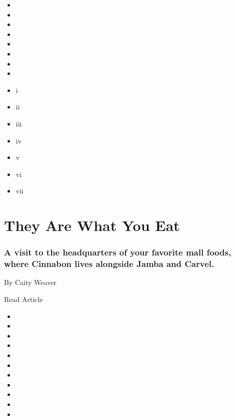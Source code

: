 \begin{itemize}
\item
\item
\item
\item
\item
\item
\item
\item
\end{itemize}

\begin{itemize}
\item
  i
\item
  ii
\item
  iii
\item
  iv
\item
  v
\item
  vi
\item
  vii
\end{itemize}

\href{https://www.nytimes.com/2019/09/17/style/moes-cinnabon-focus-brands.html}{}

\hypertarget{they-are-what-you-eat}{%
\section{They Are What You Eat}\label{they-are-what-you-eat}}

\hypertarget{a-visit-to-the-headquarters-of-your-favorite-mall-foods-where-cinnabon-lives-alongside-jamba-and-carvel}{%
\subsubsection{A visit to the headquarters of your favorite mall foods,
where Cinnabon lives alongside Jamba and
Carvel.}\label{a-visit-to-the-headquarters-of-your-favorite-mall-foods-where-cinnabon-lives-alongside-jamba-and-carvel}}

By Caity Weaver

Read Article

\begin{itemize}
\item
\item
\item
\item
\item
\item
\item
\item
\item
\item
\item
\end{itemize}


